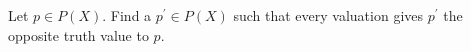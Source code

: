 Let $p \in P(X)$. Find a $p^\prime \in P(X)$ such that every valuation gives $p^\prime$ the opposite truth value to $p$.

